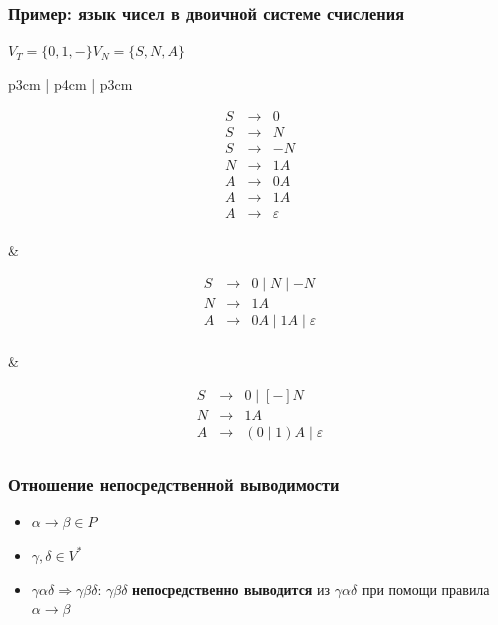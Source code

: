 \documentclass{beamer}
\begin{document}
\begin{frame}[fragile]
  \transwipe[direction=90]
  \frametitle{Пример: язык чисел в двоичной системе счисления}

\begin{center}
  $V_T = \{ 0, 1, - \} V_N = \{ S, N, A \}$
\end{center}

\begin{tabular}{p{3cm} | p{4cm} | p{3cm}}

\[
\begin{array}{rcl}
S& \rightarrow & 0 \\
S& \rightarrow & N \\
S& \rightarrow & - N \\
N& \rightarrow & 1 A \\
A& \rightarrow & 0 A \\
A& \rightarrow & 1 A \\
A& \rightarrow & \varepsilon \\
\end{array}
\]

& \pause

\[
\begin{array}{rcl}
S& \rightarrow & 0 \mid N \mid - N  \\
N& \rightarrow & 1 A \\
A& \rightarrow & 0 A \mid 1 A  \mid \varepsilon\\
\end{array}
\]

& \pause

\[
\begin{array}{rcl}
S& \rightarrow & 0 \mid [-] N  \\
N& \rightarrow & 1 A \\
A& \rightarrow & (0 \mid 1) A  \mid \varepsilon\\
\end{array}
\]

\end{tabular}
\end{frame}

\begin{frame}[fragile]
  \transwipe[direction=90]
  \frametitle{Отношение непосредственной выводимости}
  \begin{itemize}
    \item $\alpha \rightarrow \beta \in P$
    \item $\gamma, \delta \in V^*$
    \item $\gamma \alpha \delta \Rightarrow \gamma \beta \delta$: $\gamma \beta \delta$ \textbf{непосредственно выводится} из $\gamma \alpha \delta$ при помощи правила $\alpha \rightarrow \beta$
  \end{itemize}
\end{frame}
\end{document}

